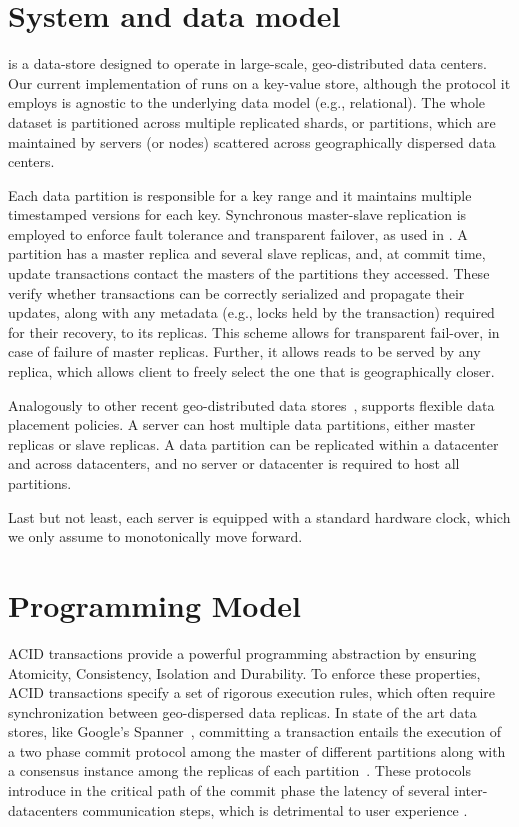 \section{System  and data  model}
\label{sec:overview}

\specula is a data-store designed to operate in large-scale, geo-distributed data centers. Our current implementation of \specula runs on a key-value store, although the protocol it employs is agnostic to the underlying data model (e.g., relational). The whole dataset is partitioned across multiple replicated shards, or partitions, which are maintained by servers (or nodes) scattered across geographically dispersed data centers.

Each data partition is responsible for a key range and it maintains multiple timestamped versions for each key.  Synchronous master-slave replication is employed to enforce fault tolerance and transparent failover, as used in \cite{spanner, baker2011megastore}. A partition has a master replica and several slave replicas, and, at commit time, update transactions contact the masters of the partitions they accessed. These verify whether transactions can be correctly serialized  and propagate their updates, along with any metadata (e.g., locks held by the transaction) required for their recovery, to its replicas.
This scheme allows for transparent fail-over, in case of failure of master replicas. Further, it allows reads to be served by any replica, which allows client to freely select the one that is geographically closer.


Analogously to other recent geo-distributed data stores~\cite{spanner, clocksi, terry2013consistency}, \specula supports flexible data placement policies. A server can host multiple data partitions, either master replicas or slave replicas. A data partition can be replicated within a datacenter and across datacenters, and no server or datacenter is required to host all partitions. 

Last but not least, each server is equipped with a standard hardware clock, which we only assume to monotonically move forward.

\section{Programming Model}
\label{sec:programming_model}

ACID transactions provide a powerful programming abstraction by ensuring Atomicity, Consistency, Isolation and Durability. To enforce these properties, ACID transactions specify a set of rigorous execution rules, which often require synchronization between geo-dispersed data replicas. In state of the art data stores, like Google's Spanner~\cite{spanner}, committing a transaction entails the execution of a two phase commit protocol among the master of different partitions along with a consensus instance among the replicas of each partition~\cite{cockroach,spanner,schiper2010p}. These protocols introduce in the critical path of the commit phase the latency of several inter-datacenters communication steps, which is detrimental to user experience \cite{schurman2009user}.

